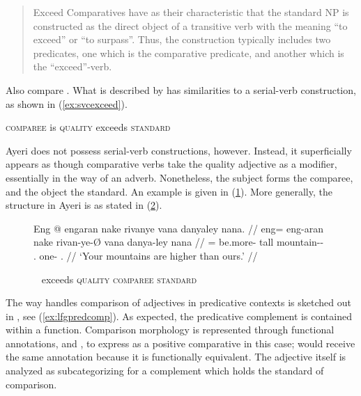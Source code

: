 \blockcquote{wals121}{Exceed Comparatives have as their characteristic that the
standard NP is constructed as the direct object of a transitive verb with the
meaning \enquote{to exceed} or \enquote{to surpass}. Thus, the construction
typically includes two predicates, one which is the comparative predicate, and
another which is the \enquote{exceed}-verb.}

Also compare \citet{beermannetal2005}. What is described by \citet{wals121} has
similarities to a serial-verb construction, as shown in (\ref{ex:svcexceed}).

\ex\label{ex:svcexceed}
	\textsc{comparee} is \textsc{quality} exceeds \textsc{standard}
\xe

Ayeri does not possess serial-verb constructions, however. Instead, it
superficially appears as though comparative verbs take the quality adjective as
a modifier, essentially in the way of an adverb. Nonetheless, the subject forms
the comparee, and the object the standard. An example is given in
(\ref{ex:ayrexceed}). More generally, the structure in Ayeri is as stated in
(\ref{ex:ayrexceedscheme}).

\begin{figure}[h]
\ex\label{ex:ayrexceed}\begingl
	\gla Eng @ engaran nake rivanye vana danyaley nana. //
	\glb eng= eng-aran nake rivan-ye-Ø vana danya-ley nana //
	\glc \AgtTI{}= be.more-\TplI{} tall mountain-\Pl{}-\Top{} \Second{}.\Gen{}
		one-\PargI{} \Fpl{}.\Gen{} //
	\glft `Your mountains are higher than ours.' //
\endgl
\xe
\end{figure}

\begin{figure}[h]
\ex~\label{ex:ayrexceedscheme}%
	exceeds \textsc{quality} \textsc{comparee} \textsc{standard}
\xe
\end{figure}

The way \Lfg{} handles comparison of adjectives in predicative contexts is
sketched out in \citet[122]{butt1999}, see (\ref{ex:lfgpredcomp}). As expected,
the predicative complement is contained within a \Plink{} function. Comparison
morphology is represented through functional annotations, \Deg{} and \Degdim{},
to express  as a positive comparative in this case; 
would receive the same annotation because it is functionally equivalent. The
adjective itself is analyzed as subcategorizing for a complement which holds
the standard of comparison.

